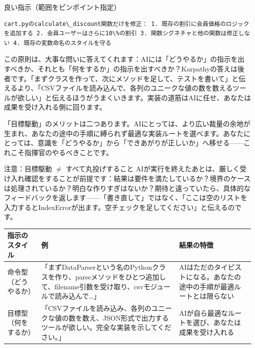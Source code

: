 良い指示（範囲をピンポイント指定）

\begin{lstlisting}
cart.pyのcalculate\_discount関数だけを修正： 1. 既存の割引に会員価格のロジックを追加する 2. 会員ユーザーはさらに10\%の割引 3. 関数シグネチャと他の関数は修正しない 4. 既存の変数命名のスタイルを守る
\end{lstlisting}


この原則は、大事な問いに答えてくれます：AIには「どうやるか」の指示を出すべきか、それとも「何をするか」の指示を出すべきか？Karpathyの答えは後者です。「まずクラスを作って、次にメソッドを足して、テストを書いて」と伝えるより、「CSVファイルを読み込んで、各列のユニークな値の数を数えるツールが欲しい」と伝えるほうがうまくいきます。実装の道筋はAIに任せ、あなたは成果を受け入れる側に回ります。

「目標駆動」のメリットは二つあります。AIにとっては、より広い裁量の余地が生まれ、あなたの途中の手順に縛られず最適な実装ルートを選べます。あなたにとっては、意識を「どうやるか」から「できあがりが正しいか」へ移せる——これこそ指揮官のやるべきことです。

\begin{tcbwarn}{注意：目標駆動 $\neq$ すべて丸投げすること}
AIが実行を終えたあとは、厳しく受け入れ確認をすることが前提です：結果は要件を満たしているか？境界のケースは処理されているか？明白な作りすぎはないか？期待と違っていたら、具体的なフィードバックを返します——「書き直して」ではなく、「ここは空のリストを入力するとIndexErrorが出ます。空チェックを足してください」と伝えるのです。

\end{tcbwarn}

\begin{center}
\begin{tabularx}{\linewidth}{|X|X|X|}
\hline
\textbf{指示のスタイル} & \textbf{例} & \textbf{結果の特徴} \tabularnewline
\hline
命令型（どうやるか） & 「まずDataParserという名のPythonクラスを作り、parseメソッドをひとつ追加して、filename引数を受け取り、csvモジュールで読み込んで…」 & AIはただのタイピストになる。あなたの途中の手順が最適ルートとは限らない \tabularnewline
目標型（何をするか） & 「CSVファイルを読み込み、各列のユニークな値の数を数え、JSON形式で出力するツールが欲しい。完全な実装を示してください。」 & AIが自ら最適なルートを選び、あなたは成果を受け入れる \tabularnewline
\hline
\end{tabularx}
\end{center}

